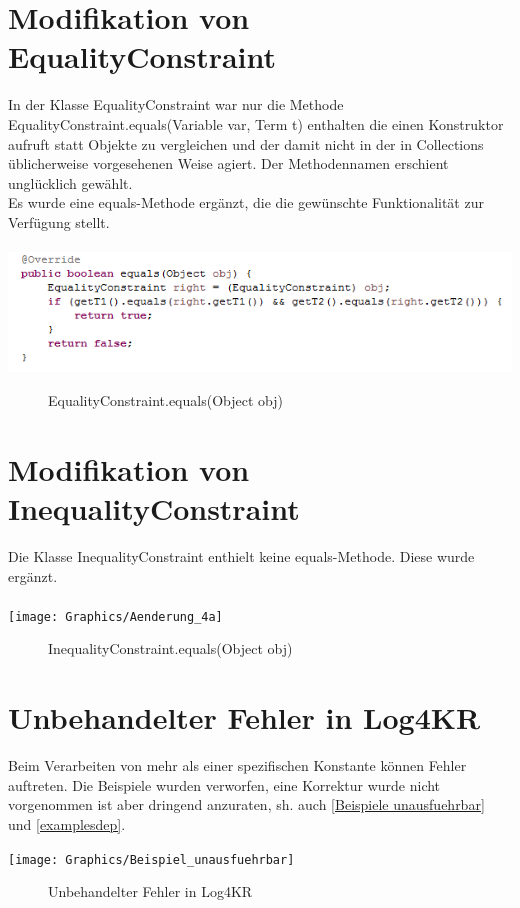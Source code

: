 \documentclass[a4paper, 11pt]{book}
\begin{document}
{\section{Modifikation von EqualityConstraint}
In der Klasse EqualityConstraint war nur die Methode EqualityConstraint.equals(Variable var, Term t) enthalten die einen Konstruktor aufruft statt Objekte zu vergleichen und der damit nicht in der in Collections üblicherweise vorgesehenen Weise agiert. Der Methodennamen erschient unglücklich gewählt.\\
Es wurde eine equals-Methode ergänzt, die die gewünschte Funktionalität zur Verfügung stellt.\\
\\
\includegraphics[scale = 0.9]{Graphics/Aenderung_3}
\begin{figure}[h]
	\caption{EqualityConstraint.equals(Object obj)}
\end{figure}


\section{Modifikation von InequalityConstraint}
Die Klasse InequalityConstraint enthielt keine equals-Methode.
Diese wurde ergänzt.\\
\\
\texttt{[image: Graphics/Aenderung\_4a]}
\begin{figure}[h]
	\caption{InequalityConstraint.equals(Object obj)}
\end{figure}


\section{Unbehandelter Fehler in Log4KR} \label{Fehler unbehandelt}
Beim Verarbeiten von mehr als einer spezifischen Konstante können Fehler auftreten. Die Beispiele wurden verworfen, eine Korrektur wurde nicht vorgenommen ist aber dringend anzuraten, sh. auch \ref{Beispiele unausfuehrbar} und \ref{examplesdep}.

\texttt{[image: Graphics/Beispiel\_unausfuehrbar]}
\begin{figure}[h]
	\caption{Unbehandelter Fehler in Log4KR}
\end{figure}




}
\end{document}
